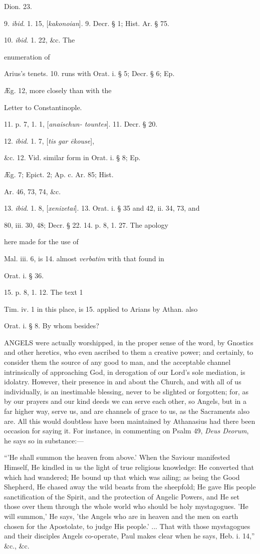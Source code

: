Dion. 23.

9. \emph{ibid}. 1. 15, [\emph{kakonoian}].
9. Decr. § 1; Hist. Ar. § 75.

10. \emph{ibid}. 1. 22, \&c. The

enumeration of

Arius's tenets.
10. runs with Orat. i. § 5; Decr. § 6; Ep.

Æg. 12, more closely than with the

Letter to Constantinople.

11. p. 7, 1. 1, [\emph{anaischun- tountes}].
11. Decr. § 20.

12. \emph{ibid}. 1. 7, [\emph{tis gar \={e}kouse}],

\&c.
12. Vid. similar form in Orat. i. § 8; Ep.

Æg. 7; Epict. 2; Ap. c. Ar. 85; Hist.

Ar. 46, 73, 74, \&c.

13. \emph{ibid}. 1. 8, [\emph{xenizetai}].
13. Orat. i. § 35 and 42, ii. 34, 73, and

80, iii. 30, 48; Decr. § 22. 14. p. 8, 1. 27. The apology

here made for the use of

Mal. iii. 6, is
14. almost \emph{verbatim} with that found in

Orat. i. § 36.

15. p. 8, 1. 12. The text 1

Tim. iv. 1 in this place, is
15. applied to Arians by Athan. also

Orat. i. § 8. By whom besides?


ANGELS were
actually worshipped, in the proper sense of the word, by Gnostics and
other heretics, who even ascribed to them a creative power; and
certainly, to consider them the source of any good to man, and the
acceptable channel intrinsically of approaching God, in derogation of
our Lord's sole mediation, is idolatry. However, their presence in and
about the Church, and with all of us individually, is an inestimable
blessing, never to be slighted or forgotten; for, as by our prayers
and our kind deeds we can serve each other, so Angels, but in a far
higher way, serve us, and are channels of grace to us, as the
Sacraments also are. All this would doubtless have been maintained by
Athanasius had there been occasion for saying it. For instance, in
commenting on Psalm 49, \emph{Deus Deorum}, he says so in
substance:—

``'He shall summon the heaven from above.' When
the Saviour manifested Himself, He kindled in us the light of true
religious knowledge: He converted that which had wandered; He bound up
that which was ailing; as being the Good Shepherd, He chased away the
wild beasts from the sheepfold; He gave His people sanctification of
the Spirit, and the protection of Angelic Powers, and He set those
over them through the whole world who should be holy mystagogues. 'He
will summon,' He says, 'the Angels who are in heaven and the men
on earth chosen for the Apostolate, to judge His people.' ... That
with those mystagogues and their disciples Angels co-operate, Paul
makes clear when he says, Heb. i. 14,'' \&c., \&c.

